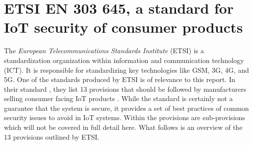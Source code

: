 \section{ETSI EN 303 645, a standard for IoT security of consumer products}
The \textit{European Telecommunications Standards Institute} (ETSI) is a standardization organization within information and communication technology (ICT). It is responsible for standardizing key technologies like GSM, 3G, 4G, and 5G. One of the standards produced by ETSI is of relevance to this report. In their standard , they list 13 provisions that should be followed by manufacturers selling consumer facing IoT products \cite{etsi-iot-standard}. While the standard is certainly not a guarantee that the system is secure, it provides a set of best practices of common security issues to avoid in IoT systems. Within the provisions are sub-provisions which will not be covered in full detail here. What follows is an overview of the 13 provisions outlined by ETSI.
